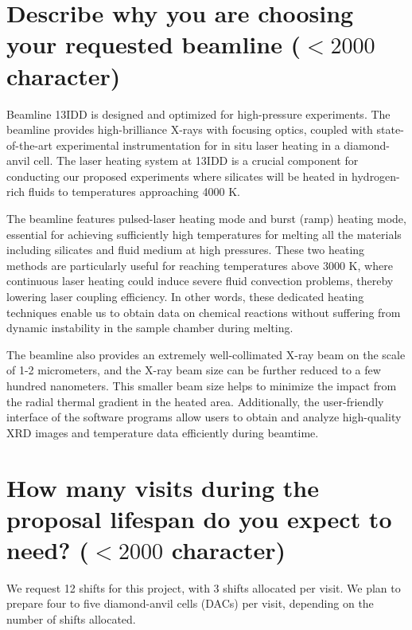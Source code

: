 \section{Describe why you are choosing your requested beamline ($<2000$ character)}

Beamline 13IDD is designed and optimized for high-pressure experiments. 
The beamline provides high-brilliance X-rays with focusing optics, coupled with state-of-the-art experimental instrumentation for in situ laser heating in a diamond-anvil cell. 
The laser heating system at 13IDD is a crucial component for conducting our proposed experiments where silicates will be heated in hydrogen-rich fluids to temperatures approaching 4000 K.

The beamline features pulsed-laser heating mode and burst (ramp) heating mode, essential for achieving sufficiently high temperatures for melting all the materials including silicates and fluid medium at high pressures. 
These two heating methods are particularly useful for reaching temperatures above 3000 K, where continuous laser heating could induce severe fluid convection problems, thereby lowering laser coupling efficiency. 
In other words, these dedicated heating techniques enable us to obtain data on chemical reactions without suffering from dynamic instability in the sample chamber during melting.

The beamline also provides an extremely well-collimated X-ray beam on the scale of 1-2 micrometers, and the X-ray beam size can be further reduced to a few hundred nanometers. 
This smaller beam size helps to minimize the impact from the radial thermal gradient in the heated area. 
Additionally, the user-friendly interface of the software programs allow users to obtain and analyze high-quality XRD images and temperature data efficiently during beamtime.



\section{How many visits during the proposal lifespan do you expect to need? ($<2000$ character)} 

We request 12 shifts for this project, with 3 shifts allocated per visit. 
We plan to prepare four to five diamond-anvil cells (DACs) per visit, depending on the number of shifts allocated.


